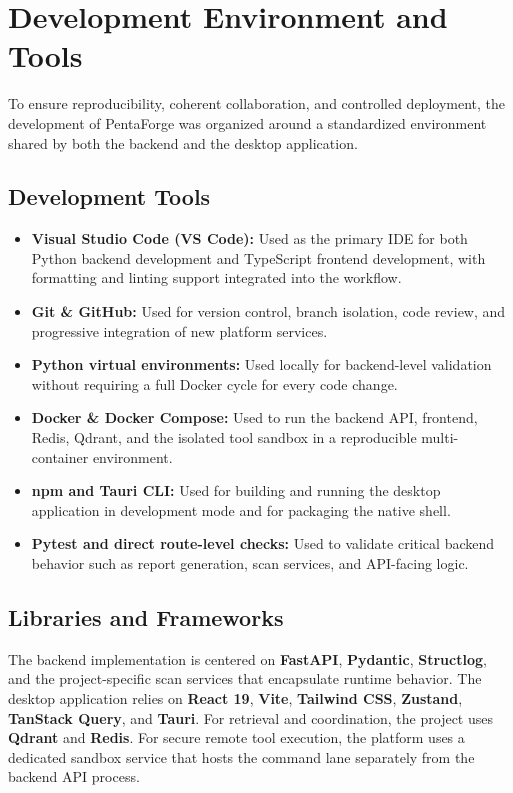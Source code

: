 \documentclass[12pt,a4paper]{report}
\begin{document}
\section{Development Environment and Tools}

To ensure reproducibility, coherent collaboration, and controlled deployment, the
development of PentaForge was organized around a standardized environment shared by
both the backend and the desktop application.

\subsection{Development Tools}

\begin{itemize}
    \item \textbf{Visual Studio Code (VS Code):} Used as the primary IDE for both
    Python backend development and TypeScript frontend development, with formatting
    and linting support integrated into the workflow.
    \item \textbf{Git \& GitHub:} Used for version control, branch isolation, code
    review, and progressive integration of new platform services.
    \item \textbf{Python virtual environments:} Used locally for backend-level
    validation without requiring a full Docker cycle for every code change.
    \item \textbf{Docker \& Docker Compose:} Used to run the backend API, frontend,
    Redis, Qdrant, and the isolated tool sandbox in a reproducible multi-container
    environment.
    \item \textbf{npm and Tauri CLI:} Used for building and running the desktop
    application in development mode and for packaging the native shell.
    \item \textbf{Pytest and direct route-level checks:} Used to validate critical
    backend behavior such as report generation, scan services, and API-facing logic.
\end{itemize}

\subsection{Libraries and Frameworks}

The backend implementation is centered on \textbf{FastAPI}, \textbf{Pydantic},
\textbf{Structlog}, and the project-specific scan services that encapsulate runtime
behavior. The desktop application relies on \textbf{React 19}, \textbf{Vite},
\textbf{Tailwind CSS}, \textbf{Zustand}, \textbf{TanStack Query}, and \textbf{Tauri}.
For retrieval and coordination, the project uses \textbf{Qdrant} and \textbf{Redis}.
For secure remote tool execution, the platform uses a dedicated sandbox service that
hosts the command lane separately from the backend API process.
\end{document}
